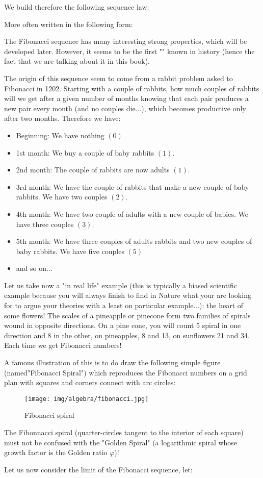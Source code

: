	We build therefore the following sequence law:
	
	More often written in the following form:
	
	The Fibonacci sequence has many interesting strong properties, which will be developed later. However, it seems to be the first "" known in history (hence the fact that we are talking about it in this book). 
	
	The origin of this sequence seem to come from a rabbit problem asked to Fibonacci in 1202. Starting with a couple of rabbits, how much couples of rabbits will we get after a given number of months knowing that each pair produces a new pair every month (and no couples die...), which becomes productive only after two months. Therefore we have:
	\begin{itemize}
		\item Beginning: We have nothing $(0)$
		\item 1st month: We buy a couple of baby rabbits $(1)$.
		\item 2nd month: The couple of rabbits are now adults $(1)$.
		\item 3rd month: We have the couple of rabbits that make a new couple of baby rabbits. We have two couples $(2)$.
		\item 4th month: We have two couple of adults with a new couple of babies. We have three couples $(3)$.
		\item 5th month: We have three couples of adults rabbits and two new couples of baby rabbits. We have five couples $(5)$
		\item and so on...
	\end{itemize}
	
	Let us take now a "in real life" example (this is typically a biased scientific example because you will always finish to find in Nature what your are looking for to argue your theories with a least on particular example...): the heart of some flowers! The scales of a pineapple or pinecone form two families of spirals wound in opposite directions. On a pine cone, you will count 5 spiral in one direction and 8 in the other, on pineapples, 8 and 13, on sunflowers 21 and 34. Each time we get Fibonacci numbers!
	
	A famous illustration of this is to do draw the following simple figure (named"Fibonacci Spiral") which reproduces the Fibonacci numbers on a grid plan with squares and corners connect with arc circles:
	
	\begin{figure}[H]
		\centering
		\texttt{[image: img/algebra/fibonacci.jpg]}
		\caption{Fibonacci spiral}
	\end{figure}
	\begin{tcolorbox}[title=Remark,colframe=black,arc=10pt]
	The Fibonnacci spiral (quarter-circles tangent to the interior of each square) must not be confused with the "Golden Spiral" (a logarithmic spiral whose growth factor is the Golden ratio $\varphi$)!
	\end{tcolorbox}
	Let us now consider the limit of the Fibonacci sequence, let:
	
